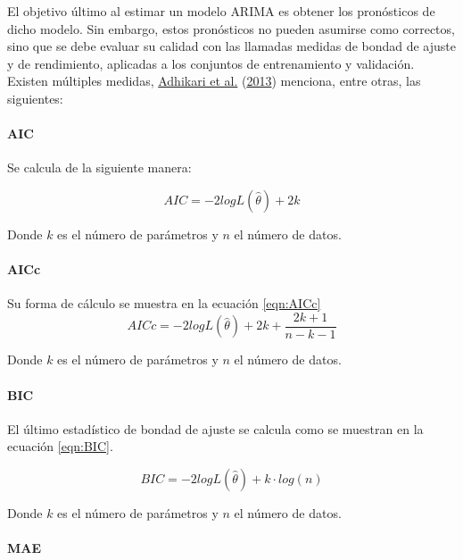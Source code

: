 \documentclass[
]{article}
\begin{document}
El objetivo último al estimar un modelo ARIMA es obtener los pronósticos
de dicho modelo. Sin embargo, estos pronósticos no pueden asumirse como
correctos, sino que se debe evaluar su calidad con las llamadas medidas
de bondad de ajuste y de rendimiento, aplicadas a los conjuntos de
entrenamiento y validación. Existen múltiples medidas,
\protect\hyperlink{ref-medidas}{Adhikari et al.}
(\protect\hyperlink{ref-medidas}{2013}) menciona, entre otras, las
siguientes:

\paragraph{AIC}

Se calcula de la siguiente manera:

\begin{equation}
\label{eqn:AIC}
AIC=-2logL\left(\hat\theta\right)+2k
\end{equation}

Donde \(k\) es el número de parámetros y \(n\) el número de datos.

\paragraph{AICc}

Su forma de cálculo se muestra en la ecuación \ref{eqn:AICc}
\begin{equation}
\label{eqn:AICc}
AICc=-2logL\left(\hat\theta\right)+2k+\frac{2k+1}{n-k-1}
\end{equation}

Donde \(k\) es el número de parámetros y \(n\) el número de datos.

\paragraph{BIC}

El último estadístico de bondad de ajuste se calcula como se muestran en
la ecuación \ref{eqn:BIC}.

\begin{equation}
\label{eqn:BIC}
BIC=-2logL\left(\hat\theta\right)+k\cdot log(n)
\end{equation}

Donde \(k\) es el número de parámetros y \(n\) el número de datos.

\paragraph{MAE}
\end{document}
